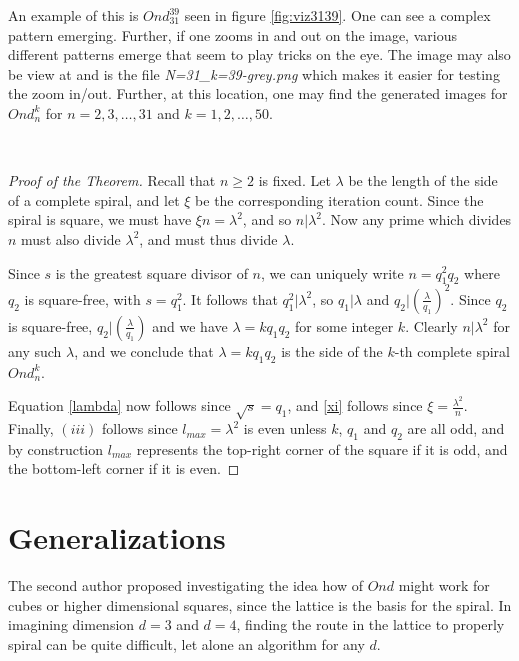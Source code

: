 \documentclass[11pt,reqno]{amsart}
\theoremstyle{mydef}
\begin{document}
An example of this is $Ond^{39}_{31}$ seen in figure \ref{fig:viz3139}. One can
see a complex pattern emerging.  Further, if one zooms
in and out on the image, various different patterns emerge that seem
to play tricks on the eye.  The image may also be view at
\cite{GraySquare} and is the file \textit{N=31\_k=39-grey.png} which
makes it easier for testing the zoom in/out.  Further, at this
location, one may find the generated images for $Ond^k_n$ for $n=2, 3,
\ldots, 31$ and $k=1,2, \ldots, 50$.

\

\begin{proof}[Proof of the Theorem]
  Recall that $n\ge 2$ is fixed.  Let $\lambda$ be the length of the
  side of a complete spiral, and let $\xi$ be the corresponding
  iteration count.  Since the spiral is square, we must have $\xi n =
  \lambda^2$, and so $n \vert \lambda^2$.  Now any prime which divides
  $n$ must also divide $\lambda^2$, and must thus divide $\lambda$.

  Since $s$ is the greatest square divisor of $n$, we can uniquely
  write $n = q^2_1 q_2$ where $q_2$ is square-free, with $s = q_1^2$.
  It follows that $q_1^2|\lambda^2$, so $q_1|\lambda$ and $q_2 |
  (\frac{\lambda}{q_1})^2$.  Since $q_2$ is square-free, $q_2|(\frac{\lambda}{q_1})$
  and we have $\lambda = k q_1 q_2$ for some integer $k$.  Clearly
  $n|\lambda^2$ for any such $\lambda$, and we conclude that $\lambda
  = k q_1 q_2$ is the side of the $k$-th complete spiral $Ond^k_n$.

  Equation \eqref{lambda} now follows since $\sqrt{s} = q_1$, and
  \eqref{xi} follows since $\xi = \frac{\lambda^2}{n}$.  Finally, $(iii)$
  follows since $l_{max} = \lambda^2$ is even unless $k$, $q_1$ and
  $q_2$ are all odd, and by construction $l_{max}$ represents the
  top-right corner of the square if it is odd, and the bottom-left
  corner if it is even.
\end{proof}


\section{Generalizations}

The second author proposed investigating the idea how of $Ond$ might
work for cubes or higher dimensional squares, since the lattice is the
basis for the spiral. In imagining dimension $d = 3$ and $d=4$, finding
the route in the lattice to properly spiral can be quite difficult, let alone an algorithm 
for any $d$. 
\end{document}
